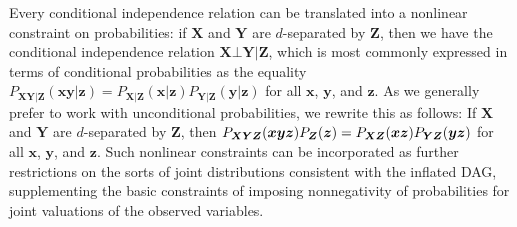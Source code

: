 Every conditional independence relation can be translated into a nonlinear constraint on probabilities: if $\bm{X}$ and $\bm{Y}$ are $d$-separated by $\bm{Z}$, then we have the conditional independence relation $\bm{X}\bot\bm{Y}|\bm{Z}$, which is most commonly expressed in terms of conditional probabilities as the equality 
$P_{\bm{X}\bm{Y}|\bm{Z}}(\bm{x}\bm{y}|\bm{z})=P_{\bm{X}|\bm{Z}}(\bm{x}|\bm{z})P_{\bm{Y}|\bm{Z}}(\bm{y}|\bm{z})$ for all $\bm{x}$, $\bm{y}$, and $\bm{z}$. As we generally prefer to work with unconditional probabilities, we rewrite this as follows: If $\bm{X}$ and $\bm{Y}$ are $d$-separated by $\bm{Z}$, then $\p[\bm{X}\bm{Y}\bm{Z}]{\bm{x}\bm{y}\bm{z}}\p[\bm{Z}]{\bm{z}}=\p[\bm{X}\bm{Z}]{\bm{x}\bm{z}}\p[\bm{Y}\bm{Z}]{\bm{y}\bm{z}}$ for all $\bm{x}$, $\bm{y}$, and $\bm{z}$. Such nonlinear constraints can be incorporated as further restrictions on the sorts of joint distributions consistent with the inflated DAG, supplementing the basic constraints of imposing nonnegativity of probabilities for joint valuations of the observed variables.

